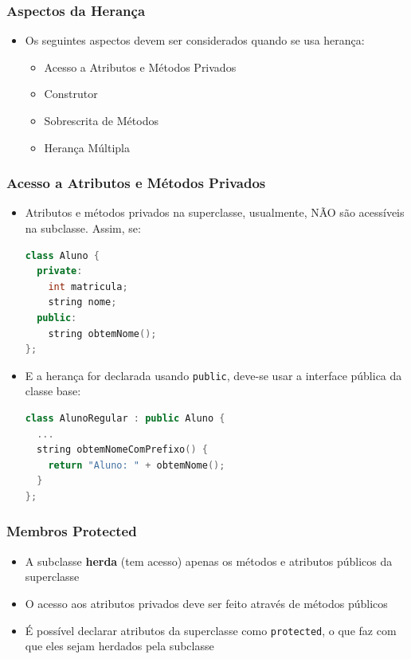 \documentclass[aspectratio=169]{beamer}
\begin{document}
\begin{frame}\frametitle{Aspectos da Herança}
\begin{itemize}
	\item Os seguintes aspectos devem ser considerados quando se usa herança:
	\begin{itemize}
		\item Acesso a Atributos e Métodos Privados
		\item Construtor
		\item Sobrescrita de Métodos
		\item Herança Múltipla
	\end{itemize}
\end{itemize}
\end{frame}

\begin{frame}[fragile]\frametitle{Acesso a Atributos e Métodos Privados}
\begin{itemize}
	\item Atributos e métodos privados na superclasse, usualmente, NÃO são acessíveis na subclasse. Assim, se:
\begin{lstlisting}[language=C++,basicstyle=\ttfamily\scriptsize]
class Aluno {
  private:
    int matricula;
    string nome;
  public:
    string obtemNome();
};
\end{lstlisting}
	\item E a herança for declarada usando \texttt{public}, deve-se usar a interface pública da classe base:
\begin{lstlisting}[language=C++,basicstyle=\ttfamily\scriptsize]
class AlunoRegular : public Aluno {
  ...
  string obtemNomeComPrefixo() {
    return "Aluno: " + obtemNome();
  }
};
\end{lstlisting}
\end{itemize}
\end{frame}

\begin{frame}\frametitle{Membros Protected}
\begin{itemize}
	\item A subclasse \textbf{herda} (tem acesso) apenas os métodos e atributos públicos da superclasse
	\item O acesso aos atributos privados deve ser feito através de métodos públicos
	\item É possível declarar atributos da superclasse como \texttt{protected}, o que faz com que eles sejam herdados pela subclasse
\end{itemize}
\end{frame}
\end{document}
